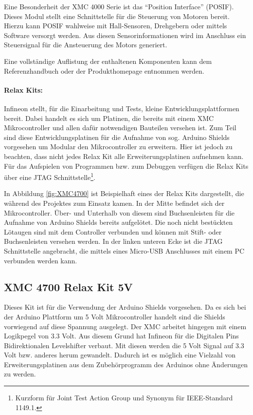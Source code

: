 Eine Besonderheit der XMC 4000 Serie ist das \enquote{Position Interface} (POSIF).
Dieses Modul stellt eine Schnittstelle für die Steuerung von Motoren bereit.
Hierzu kann POSIF wahlweise mit Hall-Sensoren, Drehgebern oder mittels Software versorgt werden.
Aus diesen Sensorinformationen wird im Anschluss ein Steuersignal für die Ansteuerung des Motors generiert.\cite{InfineonTechnologies2016a}

Eine vollständige Auflistung der enthaltenen Komponenten kann dem Referenzhandbuch \cite{InfineonTechnologies2016} oder der Produkthomepage \cite{InfineonTechnologies2017} entnommen werden.

\newpage
\paragraph{Relax Kits:}
Infineon stellt, für die Einarbeitung und Tests, kleine Entwicklungsplattformen bereit.
Dabei handelt es sich um Platinen, die bereits mit einem XMC Mikrocontroller und allen dafür notwendigen Bauteilen versehen ist.
Zum Teil sind diese Entwicklungsplatinen für die Aufnahme von sog. Arduino Shields vorgesehen um Modular den Mikrocontroller zu erweitern.
Hier ist jedoch zu beachten, dass nicht jedes Relax Kit alle Erweiterungsplatinen aufnehmen kann.
Für das Aufspielen von Programmen bzw. zum Debuggen verfügen die Relax Kits über eine JTAG Schnittstelle\footnote{Kurzform für Joint Test Action Group und Synonym für IEEE-Standard 1149.1.}.

In Abbildung \ref{fig:XMC4700} ist Beispielhaft eines der Relax Kits dargestellt, die während des Projektes zum Einsatz kamen.
In der Mitte befindet sich der Mikrocontroller. 
Über- und Unterhalb von diesem sind Buchsenleisten für die Aufnahme von Arduino Shields bereits aufgelötet.
Die noch nicht bestückten Lötaugen sind mit dem Controller verbunden und können mit Stift- oder Buchsenleisten versehen werden.
In der linken unteren Ecke ist die JTAG Schnittstelle angebracht, die mittels eines Micro-USB Anschlusses mit einem PC verbunden werden kann. 
\subsection{XMC 4700 Relax Kit 5V}
\label{sec:XMC4700}
Dieses Kit ist für die Verwendung der Arduino Shields vorgesehen.
Da es sich bei der Arduino Plattform um 5 Volt Mikrocontroller handelt sind die Shields vorwiegend auf diese Spannung ausgelegt.
Der XMC arbeitet hingegen mit einem Logikpegel von 3.3 Volt.
Aus diesem Grund hat Infineon für die Digitalen Pins Bidirektionalen Levelshifter verbaut.
Mit diesen werden die 5 Volt Signal auf 3.3 Volt bzw. anderes herum gewandelt.
Dadurch ist es möglich eine Vielzahl von Erweiterungsplatinen aus dem Zubehörprogramm des Arduinos ohne Änderungen zu werden.

